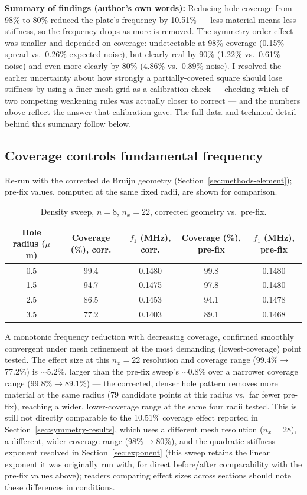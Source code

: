 \documentclass[11pt]{article}
\begin{document}
\textbf{Summary of findings (author's own words):} Reducing hole coverage from 98\% to 80\% reduced the plate's frequency by 10.51\% --- less material means less stiffness, so the frequency drops as more is removed. The symmetry-order effect was smaller and depended on coverage: undetectable at 98\% coverage (0.15\% spread vs.\ 0.26\% expected noise), but clearly real by 90\% (1.22\% vs.\ 0.61\% noise) and even more clearly by 80\% (4.86\% vs.\ 0.89\% noise). I resolved the earlier uncertainty about how strongly a partially-covered square should lose stiffness by using a finer mesh grid as a calibration check --- checking which of two competing weakening rules was actually closer to correct --- and the numbers above reflect the answer that calibration gave. The full data and technical detail behind this summary follow below.

\subsection{Coverage controls fundamental frequency}

Re-run with the corrected de Bruijn geometry (Section~\ref{sec:methods-element}); pre-fix values, computed at the same fixed radii, are shown for comparison.

\begin{table}[h]
\centering
\caption{Density sweep, $n=8$, $n_x=22$, corrected geometry vs.\ pre-fix.}
\begin{tabular}{ccccc}
\toprule
Hole radius ($\mu$m) & Coverage (\%), corr. & $f_1$ (MHz), corr. & Coverage (\%), pre-fix & $f_1$ (MHz), pre-fix \\
\midrule
0.5 & 99.4 & 0.1480 & 99.8 & 0.1480 \\
1.5 & 94.7 & 0.1475 & 97.8 & 0.1480 \\
2.5 & 86.5 & 0.1453 & 94.1 & 0.1478 \\
3.5 & 77.2 & 0.1403 & 89.1 & 0.1468 \\
\bottomrule
\end{tabular}
\end{table}

A monotonic frequency reduction with decreasing coverage, confirmed smoothly convergent under mesh refinement at the most demanding (lowest-coverage) point tested. The effect size at this $n_x=22$ resolution and coverage range (99.4\%$\to$77.2\%) is $\sim$5.2\%, larger than the pre-fix sweep's $\sim$0.8\% over a narrower coverage range (99.8\%$\to$89.1\%) --- the corrected, denser hole pattern removes more material at the same radius (79 candidate points at this radius vs.\ far fewer pre-fix), reaching a wider, lower-coverage range at the same four radii tested. This is still not directly comparable to the 10.51\% coverage effect reported in Section~\ref{sec:symmetry-results}, which uses a different mesh resolution ($n_x=28$), a different, wider coverage range (98\%$\to$80\%), and the quadratic stiffness exponent resolved in Section~\ref{sec:exponent} (this sweep retains the linear exponent it was originally run with, for direct before/after comparability with the pre-fix values above); readers comparing effect sizes across sections should note these differences in conditions.
\end{document}
